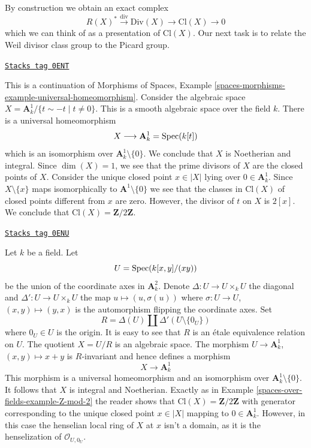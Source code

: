 By construction we obtain an exact complex
\begin{equation}
\label{equation-Weil-divisor-class}
R(X)^* \xrightarrow{\text{div}} \text{Div}(X) \to \text{Cl}(X) \to 0
\end{equation}
which we can think of as a presentation of $\text{Cl}(X)$. Our next task
is to relate the Weil divisor class group to the Picard group.

\begin{example}[Z mod 2]
\label{spaces-over-fields-example-Z-mod-2}
\href{https://stacks.math.columbia.edu/tag/0ENT}{\texttt{Stacks tag 0ENT}}

This is a continuation of Morphisms of Spaces, Example
\ref{spaces-morphisms-example-universal-homeomorphism}.
Consider the algebraic space
$X = \mathbf{A}^1_k/\{t \sim -t \mid t \not = 0\}$.
This is a smooth algebraic space over the field $k$.
There is a universal homeomorphism
$$
X \longrightarrow \mathbf{A}^1_k = \operatorname{Spec}(k[t])
$$
which is an isomorphism over $\mathbf{A}^1_k \setminus \{0\}$.
We conclude that $X$ is Noetherian and integral.
Since $\dim(X) = 1$, we see that the prime divisors of $X$ are
the closed points of $X$.
Consider the unique closed point $x \in |X|$ lying over $0 \in \mathbf{A}^1_k$.
Since $X \setminus \{x\}$ maps isomorphically to $\mathbf{A}^1 \setminus \{0\}$
we see that the classes in $\text{Cl}(X)$ of closed points different
from $x$ are zero. However, the divisor of $t$ on $X$ is $2[x]$.
We conclude that $\text{Cl}(X) = \mathbf{Z}/2\mathbf{Z}$.
\end{example}

\begin{example}
\label{spaces-over-fields-example-not-a-domain}
\href{https://stacks.math.columbia.edu/tag/0ENU}{\texttt{Stacks tag 0ENU}}

Let $k$ be a field. Let
$$
U = \operatorname{Spec}(k[x, y]/(xy))
$$
be the union of the coordinate axes in $\mathbf{A}^2_k$.
Denote $\Delta : U \to U \times_k U$ the diagonal and
$\Delta' : U \to U \times_k U$ the map $u \mapsto (u, \sigma(u))$
where $\sigma : U \to U$, $(x, y) \mapsto (y, x)$
is the automorphism flipping the coordinate axes. Set
$$
R = \Delta(U) \amalg \Delta'(U \setminus \{0_U\})
$$
where $0_U \in U$ is the origin. It is easy to see that
$R$ is an \'etale equivalence relation on $U$. The quotient $X = U/R$
is an algebraic space. The morphism $U \to \mathbf{A}^1_k$,
$(x, y) \mapsto x + y$ is $R$-invariant and hence defines
a morphism
$$
X \longrightarrow \mathbf{A}^1_k
$$
This morphism is a universal homeomorphism and an isomorphism over
$\mathbf{A}^1_k \setminus \{0\}$. It follows that $X$ is integral
and Noetherian. Exactly as in Example \ref{spaces-over-fields-example-Z-mod-2}
the reader shows that $\text{Cl}(X) = \mathbf{Z}/2\mathbf{Z}$
with generator corresponding to the unique closed point $x \in |X|$
mapping to $0 \in \mathbf{A}^1_k$. However, in this case the henselian
local ring of $X$ at $x$ isn't a domain, as it is the henselization
of $\mathcal{O}_{U, 0_U}$.
\end{example}

